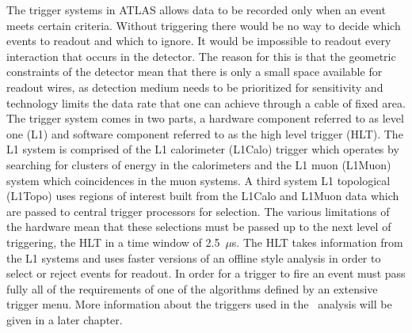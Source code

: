 The trigger systems in ATLAS allows data to be recorded only when an event meets
certain criteria. Without triggering there would be no way to decide which
events to readout and which to ignore. It would be impossible to readout every
interaction that occurs in the detector. The reason for this is that the
geometric constraints of the detector mean that there is only a small space
available for readout wires, as detection medium needs to be prioritized for
sensitivity and technology limits the data rate that one can achieve through a
cable of fixed area. The trigger system comes in two parts, a hardware component
referred to as level one (L1) and software component referred to as the high
level trigger (HLT). The L1 system is comprised of the L1 calorimeter (L1Calo)
trigger which operates by searching for clusters of energy in the calorimeters
and the L1 muon (L1Muon) system which coincidences in the muon systems. A third
system L1 topological (L1Topo) uses regions of interest built from the L1Calo
and L1Muon data which are passed to central trigger processors for selection.
The various limitations of the hardware mean that these selections must be
passed up to the next level of triggering, the HLT in a time window of
2.5~$\mu$s. The HLT takes information from the L1 systems and uses faster
versions of an offline style analysis in order to select or reject events for
readout. In order for a  trigger to fire an event must pass fully all of the
requirements of one of the algorithms defined by an extensive trigger menu. More
information about the triggers used in the \VHbb\ analysis will be given in a
later chapter.
